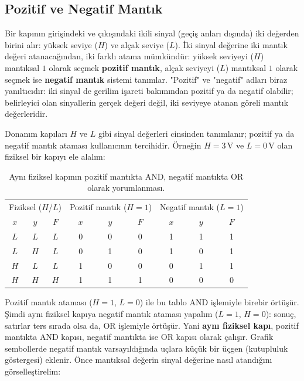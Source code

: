 \subsection{Pozitif ve Negatif Mantık}
\label{sec:pozitif-negatif-mantik}

Bir kapının girişindeki ve çıkışındaki ikili sinyal (geçiş anları dışında) iki değerden
birini alır: yüksek seviye ($H$) ve alçak seviye ($L$). İki sinyal değerine iki mantık
değeri atanacağından, iki farklı atama mümkündür: yüksek seviyeyi ($H$) mantıksal $1$
olarak seçmek \textbf{pozitif mantık}, alçak seviyeyi ($L$) mantıksal $1$ olarak seçmek
ise \textbf{negatif mantık} sistemi tanımlar. "Pozitif" ve "negatif" adları biraz
yanıltıcıdır: iki sinyal de gerilim işareti bakımından pozitif ya da negatif olabilir;
belirleyici olan sinyallerin gerçek değeri değil, iki seviyeye atanan göreli mantık
değerleridir.

Donanım kapıları $H$ ve $L$ gibi sinyal değerleri cinsinden tanımlanır; pozitif ya da
negatif mantık ataması kullanıcının tercihidir. Örneğin $H=3\,\text{V}$ ve $L=0\,\text{V}$
olan fiziksel bir kapıyı ele alalım:

\begin{table}[H]
\centering
\begin{tabular}{ccc|ccc|ccc}
\toprule
\multicolumn{3}{c|}{Fiziksel ($H$/$L$)} & \multicolumn{3}{c|}{Pozitif mantık ($H{=}1$)} & \multicolumn{3}{c}{Negatif mantık ($L{=}1$)}\\
$x$&$y$&$F$&$x$&$y$&$F$&$x$&$y$&$F$\\
\midrule
$L$&$L$&$L$&0&0&0&1&1&1\\
$L$&$H$&$L$&0&1&0&1&0&1\\
$H$&$L$&$L$&1&0&0&0&1&1\\
$H$&$H$&$H$&1&1&1&0&0&0\\
\bottomrule
\end{tabular}
\caption{Aynı fiziksel kapının pozitif mantıkta AND, negatif mantıkta OR olarak
yorumlanması.}
\label{tab:pozitif-negatif}
\end{table}

Pozitif mantık ataması ($H=1$, $L=0$) ile bu tablo AND işlemiyle birebir örtüşür.
Şimdi aynı fiziksel kapıya negatif mantık ataması yapalım ($L=1$, $H=0$): sonuç, satırlar
ters sırada olsa da, OR işlemiyle örtüşür. Yani \textbf{aynı fiziksel kapı}, pozitif
mantıkta AND kapısı, negatif mantıkta ise OR kapısı olarak çalışır. Grafik sembollerde
negatif mantık varsayıldığında uçlara küçük bir üçgen (kutupluluk göstergesi) eklenir.
Önce mantıksal değerin sinyal değerine nasıl atandığını görselleştirelim:

